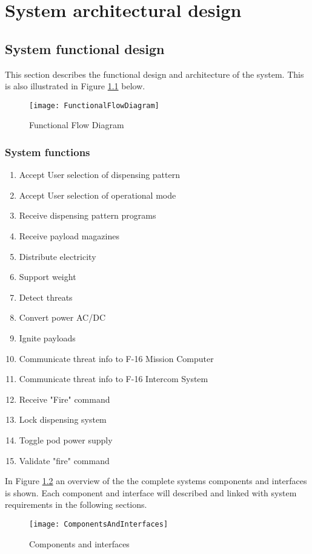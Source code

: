 \documentclass[Main]{subfiles}
\begin{document}
\chapter{System architectural design}
\section{System functional design}
This section describes the functional design and architecture of the system.
This is also illustrated in Figure \ref{fig:FFD} below.

\begin{figure}[H]
\centering
\texttt{[image: FunctionalFlowDiagram]}
\caption{Functional Flow Diagram}
\label{fig:FFD}
\end{figure}

\subsection{System functions}
\begin{enumerate}[label=F.\arabic*:]
\item Accept User selection of dispensing pattern
\item Accept User selection of operational mode
\item Receive dispensing pattern programs
\item Receive payload magazines
\item Distribute electricity
\item Support weight
\item Detect threats
\item Convert power AC/DC
\item Ignite payloads
\item Communicate threat info to F-16 Mission Computer
\item Communicate threat info to F-16 Intercom System
\item Receive "Fire" command
\item Lock dispensing system
\item Toggle pod power supply
\item Validate "fire" command




\end{enumerate}


In Figure \ref{fig:ComponentsAndInterfaces} an overview of the the complete systems components and interfaces is shown. Each component and interface will described and linked with system requirements in the following sections.

\begin{figure}[H]
\centering
\texttt{[image: ComponentsAndInterfaces]}
\caption{Components and interfaces}
\label{fig:ComponentsAndInterfaces}
\end{figure}


\newpage

\newpage

\end{document}
